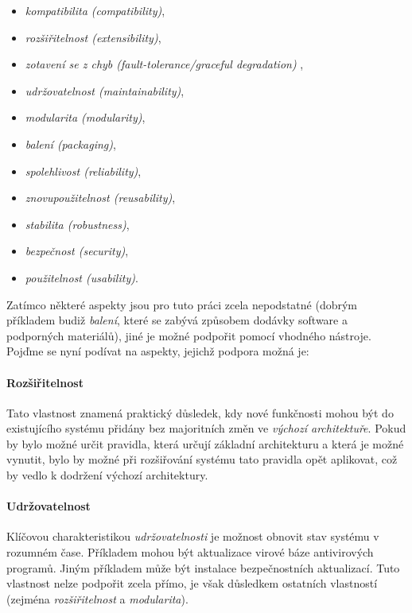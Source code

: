 \begin{itemize}
\item \emph{kompatibilita (compatibility)},
\item \emph{rozšiřitelnost (extensibility)},
\item \emph{zotavení se z chyb (fault-tolerance/graceful degradation)} \cite{wiki:fault-tolerance},
\item \emph{udržovatelnost (maintainability)},
\item \emph{modularita (modularity)},
\item \emph{balení (packaging)},
\item \emph{spolehlivost (reliability)},
\item \emph{znovupoužitelnost (reusability)},
\item \emph{stabilita (robustness)},
\item \emph{bezpečnost (security)},
\item \emph{použitelnost (usability)}.
\end{itemize}

Zatímco některé aspekty jsou pro tuto práci zcela nepodstatné (dobrým příkladem budiž \emph{balení}, které se zabývá způsobem dodávky software a podporných materiálů), jiné je možné podpořit pomocí vhodného nástroje. Pojďme se nyní podívat na aspekty, jejichž podpora možná je:

\paragraph{Rozšiřitelnost} Tato vlastnost znamená praktický důsledek, kdy nové funkčnosti mohou být do existujícího systému přidány bez majoritních změn ve \emph{výchozí architektuře}. Pokud by bylo možné určit pravidla, která určují základní architekturu a která je možné vynutit, bylo by možné při rozšiřování systému tato pravidla opět aplikovat, což by vedlo k dodržení výchozí architektury.

\paragraph{Udržovatelnost} Klíčovou charakteristikou \emph{udržovatelnosti} je možnost obnovit stav systému v rozumném čase. Příkladem mohou být aktualizace virové báze antivirových programů. Jiným příkladem může být instalace bezpečnostních aktualizací. Tuto vlastnost nelze podpořit zcela přímo, je však důsledkem ostatních vlastností (zejména \emph{rozšiřitelnost} a \emph{modularita}).

